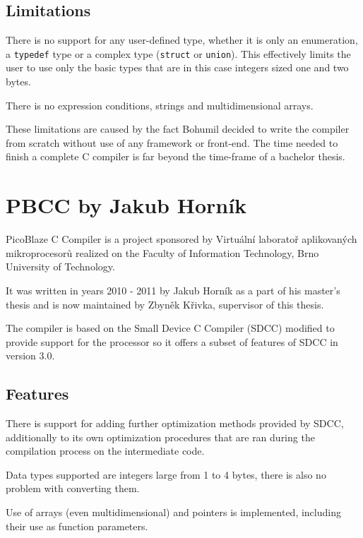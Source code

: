         \subsection{Limitations}

        There is no support for any user-defined type, whether it is only an enumeration, a \texttt{typedef} type or a complex type (\texttt{struct} or \texttt{union}). This effectively limits the user to use only the basic types that are in this case integers sized one and two bytes.

        There is no expression conditions, strings and multidimensional arrays.

        These limitations are caused by the fact Bohumil decided to write the compiler
        from scratch without use of any framework or front-end. The time needed to finish a complete C compiler is far beyond the time-frame of a bachelor thesis.

    \section{PBCC by Jakub Horník}\label{prev_pbcc}

    PicoBlaze C Compiler is a project sponsored by Virtuální laboratoř aplikovaných mikroprocesorů
    realized on the Faculty of Information Technology, Brno University of Technology.

    It was written in years 2010 - 2011 by Jakub Horník as a part of his master's thesis and is now maintained by Zbyněk Křivka, supervisor of this thesis.\cite{PbccProjekt}

    The compiler is based on the Small Device C Compiler (SDCC) modified to provide support for the processor so it offers a subset of features of SDCC in version 3.0.\cite{PbccHornik}

        \subsection{Features}

        There is support for adding further optimization methods provided by SDCC, additionally to its own optimization procedures 
        that are ran during the compilation process on the intermediate code.

        Data types supported are integers large from 1 to 4 bytes, there is also no problem with converting them.

        Use of arrays (even multidimensional) and pointers is implemented, including their use as function parameters.

